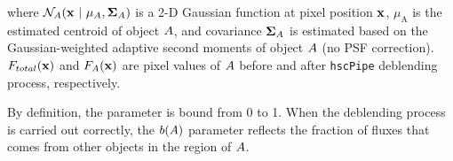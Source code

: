 \documentclass[useamsfonts]{pasj01}
\def\hscpipe{\texttt{hscPipe}}
\begin{document}
    \noindent
    where $\mathcal{N}_{\rm{A}}({ \bf x }\ |\  \mu_{\rm{A}}, {\bf\Sigma}_{\rm{A}})$
    is a 2-D Gaussian function at pixel position $\bf x$, $\mu_{\mathrm{A}}$ is the
    estimated centroid of object ${\rm A}$, and covariance ${\bf \Sigma}_{\mathrm{A}}$
    is estimated based on the Gaussian-weighted adaptive second moments of object
    ${\rm A}$ (no PSF correction).
    $F_{\mathrm{total}}({\bf x })$ and $F_{\rm{A}}({\bf x })$ are pixel values of
    ${\rm A}$ before and after \hscpipe{} deblending process, respectively.

    By definition, the parameter is bound from 0 to 1.
    When the deblending process is carried out correctly, the $b({\rm A})$ parameter
    reflects the fraction of fluxes that comes from other objects in the
    region of ${\rm A}$.

%

\label{lastpage}
\end{document}
